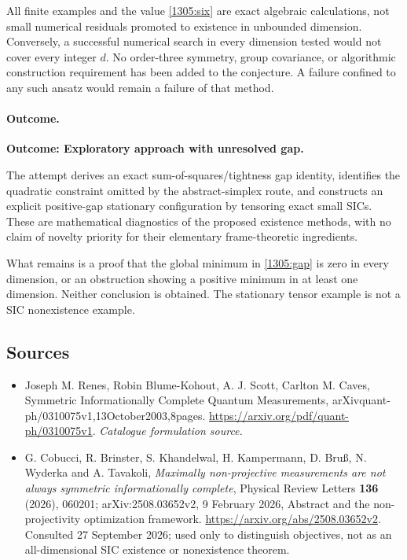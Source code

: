 \documentclass[11pt,a4paper]{article}
\numberwithin{equation}{section}
\begin{document}
All finite examples and the value \eqref{1305:six} are exact algebraic
calculations, not small numerical residuals promoted to existence in
unbounded dimension. Conversely, a successful numerical search in every
dimension tested would not cover every integer $d$. No order-three
symmetry, group covariance, or algorithmic construction requirement has
been added to the conjecture. A failure confined to any such ansatz
would remain a failure of that method.

\paragraph{Outcome.}
\textbf{Outcome: Exploratory approach with unresolved gap.}

The attempt derives an exact sum-of-squares/tightness gap identity,
identifies the quadratic constraint omitted by the abstract-simplex
route, and constructs an explicit positive-gap stationary configuration
by tensoring exact small SICs. These are mathematical diagnostics of the
proposed existence methods, with no claim of novelty priority for their
elementary frame-theoretic ingredients.

What remains is a proof that the global minimum in
\eqref{1305:gap} is zero in every dimension, or an obstruction showing a
positive minimum in at least one dimension. Neither conclusion is
obtained. The stationary tensor example is not a SIC nonexistence
example.
\subsection{Sources}
\begin{itemize}\raggedright
\item[\textnormal{[S1]}]\hypertarget{source:1305:1}{} Joseph M. Renes, Robin Blume-Kohout, A. J. Scott, Carlton M. Caves, Symmetric Informationally Complete Quantum Measurements, arXivquant-ph/0310075v1,13October2003,8pages.
\url{https://arxiv.org/pdf/quant-ph/0310075v1}.
{\small\textit{Catalogue formulation source.}}
\item[\textnormal{[E1]}]\hypertarget{extra:1305:1}{}
G. Cobucci, R. Brinster, S. Khandelwal, H. Kampermann, D. Bru\ss,
N. Wyderka and A. Tavakoli, \emph{Maximally non-projective measurements
are not always symmetric informationally complete}, Physical Review
Letters \textbf{136} (2026), 060201; arXiv:2508.03652v2,
9 February 2026, Abstract and the non-projectivity optimization framework.
\url{https://arxiv.org/abs/2508.03652v2}.
Consulted 27 September 2026; used only to distinguish objectives, not as
an all-dimensional SIC existence or nonexistence theorem.
\end{itemize}
\end{document}

